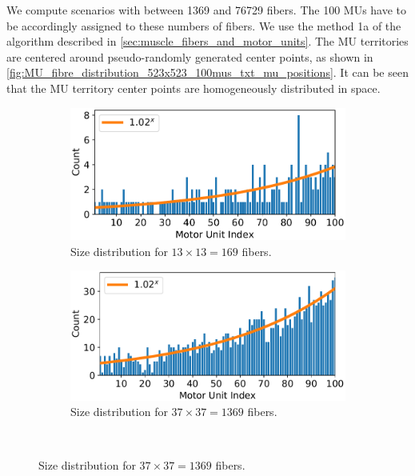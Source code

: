 We compute scenarios with between \num{1369} and \num{76729} fibers. The 100 MUs have to be accordingly assigned to these numbers of fibers.
We use the method 1a of the algorithm described in \cref{sec:muscle_fibers_and_motor_units}. The MU territories are centered around pseudo-randomly generated center points, as shown in \cref{fig:MU_fibre_distribution_523x523_100mus_txt_mu_positions}. It can be seen that the MU territory center points are homogeneously distributed in space.


\begin{figure}
  \centering%
  \begin{subfigure}[t]{0.45\textwidth}%
    \centering%
    \includegraphics[width=\textwidth]{images/results/application/MU_fibre_distribution_13x13_100mus_txt_fiber_distribution.pdf}%
    \caption{Size distribution for $13\times 13 = 169$ fibers.}%
    \label{fig:mus_13}%
  \end{subfigure} \quad
  \begin{subfigure}[t]{0.45\textwidth}%
    \centering%
    \includegraphics[width=\textwidth]{images/results/application/MU_fibre_distribution_37x37_100mus_txt_fiber_distribution.pdf}%
    \caption{Size distribution for $37\times 37 = 1369$ fibers.}%
    \label{fig:mus_37}%
  \end{subfigure}  \\

\end{figure}
